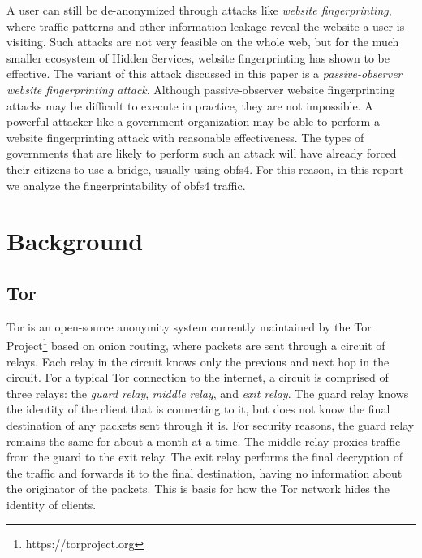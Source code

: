 \documentclass[11pt]{article}
\begin{document}
A user can still be de-anonymized through attacks like \textit{website fingerprinting}, where traffic patterns and other information leakage reveal the website a user is visiting. Such attacks are not very feasible on the whole web, but for the much smaller ecosystem of Hidden Services, website fingerprinting has shown to be effective\cite{panchenko, wang}.
The variant of this attack discussed in this paper is a \textit{passive-observer website fingerprinting attack}. Although passive-observer website fingerprinting attacks may be difficult to execute in practice, they are not impossible. A powerful attacker like a government organization may be able to perform a website fingerprinting attack with reasonable effectiveness. The types of governments that are likely to perform such an attack will have already forced their citizens to use a bridge, usually using obfs4. For this reason, in this report we analyze the fingerprintability of obfs4 traffic.

\section{Background}
\subsection{Tor}
Tor is an open-source anonymity system currently maintained by the Tor Project\footnote{https://torproject.org} based on onion routing, where packets are sent through a circuit of relays. Each relay in the circuit knows only the previous and next hop in the circuit. For a typical Tor connection to the internet, a circuit is comprised of three relays: the \textit{guard relay}, \textit{middle relay}, and \textit{exit relay}. The guard relay knows the identity of the client that is connecting to it, but does not know the final destination of any packets sent through it is. For security reasons, the guard relay remains the same for about a month at a time. The middle relay proxies traffic from the guard to the exit relay. The exit relay performs the final decryption of the traffic and forwards it to the final destination, having no information about the originator of the packets.
This is basis for how the Tor network hides the identity of clients.
\end{document}
